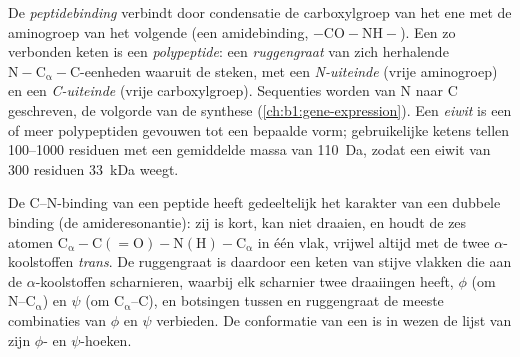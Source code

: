 \begin{definition}\label{def:b1:proteins:peptide}
De \emph{peptidebinding} verbindt door condensatie de
carboxylgroep van het ene  met de aminogroep van het volgende (een
amidebinding, $\mathrm{-CO{-}NH-}$). Een zo verbonden keten  is een
\emph{polypeptide}: een \emph{ruggengraat} van zich herhalende
$\mathrm{N{-}C_\alpha{-}C}$-eenheden waaruit de  steken, met een
\emph{N-uiteinde} (vrije aminogroep) en een \emph{C-uiteinde} (vrije
carboxylgroep). Sequenties worden van N naar C geschreven, de volgorde van de
synthese (\cref{ch:b1:gene-expression}). Een \emph{eiwit} is een of
meer polypeptiden gevouwen tot een bepaalde vorm; gebruikelijke ketens tellen
\qtyrange{100}{1000}{} residuen met een gemiddelde massa van \qty{110}{Da}, zodat
een eiwit van \qty{300}{} residuen \qty{33}{kDa} weegt.
\end{definition}

\begin{proposition}\label{prop:b1:proteins:geometry}
De C--N-binding van een peptide heeft gedeeltelijk het karakter van een dubbele
binding (de amideresonantie): zij is kort, kan niet draaien, en houdt de zes
atomen $\mathrm{C_\alpha{-}C(=O){-}N(H){-}C_\alpha}$ in één vlak, vrijwel altijd
met de twee $\alpha$-koolstoffen \emph{trans}. De ruggengraat is daardoor een
keten van stijve vlakken die aan de $\alpha$-koolstoffen scharnieren, waarbij elk
scharnier twee draaiingen heeft, $\phi$ (om N--$\mathrm{C_\alpha}$) en $\psi$ (om
$\mathrm{C_\alpha}$--C), en botsingen tussen  en ruggengraat de meeste
combinaties van $\phi$ en $\psi$ verbieden. De conformatie van een  is in
wezen de lijst van zijn $\phi$- en $\psi$-hoeken.
\end{proposition}

